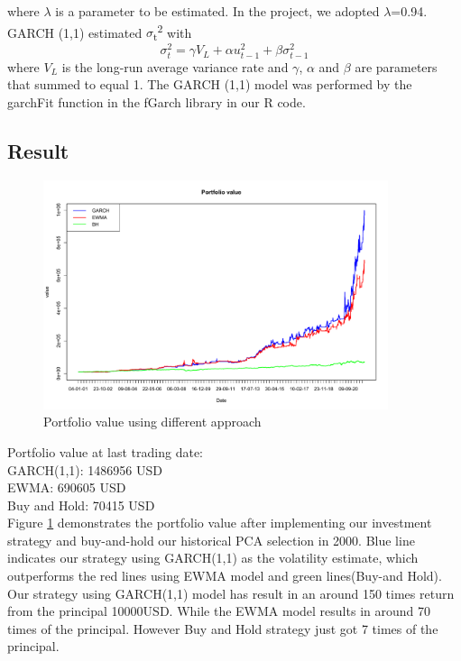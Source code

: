 \documentclass[11pt,a4paper]{article}
\begin{document}
    where \(\lambda\) is a parameter to be estimated. In the project, we adopted \(\lambda\)=0.94.
    GARCH (1,1) estimated \(\sigma\)\textsubscript{t}\textsuperscript{2} with    
    \begin{equation}
    \sigma_{t}^{2} = \gamma V_{L}+\alpha u_{t-1}^{2} + \beta \sigma_{t-1}^{2}
    \end{equation}
    where \(V_{L}\) is the long-run average variance rate and \(\gamma\), \(\alpha\) and \(\beta\) are parameters that summed to equal 1.
    The GARCH (1,1) model was performed by the garchFit function in the fGarch library in our R code.
    
    
    \newpage
    \subsection{Result}
    \begin{figure}[!ht]
        \centering
        \includegraphics[width = 0.9\textwidth]{plot/PCA/1.pdf}
        \caption{Portfolio value using different approach}
        \label{fig:Fig.1}
    \end{figure}
    
    \noindent Portfolio value at last trading date: \\
    GARCH(1,1): 1486956 USD\\
    EWMA: 690605 USD\\
    Buy and Hold: 70415 USD\\
    Figure \ref{fig:Fig.1} demonstrates the  portfolio value after implementing our investment strategy and buy-and-hold our historical PCA selection in 2000. Blue line indicates our strategy using GARCH(1,1) as the volatility estimate, which outperforms the red lines using EWMA model and green lines(Buy-and Hold). Our strategy using GARCH(1,1) model has result in an around 150 times return from the principal 10000USD. While the EWMA model results in around 70 times of the principal. However Buy and Hold strategy just got 7 times of the principal.
    
\end{document}
